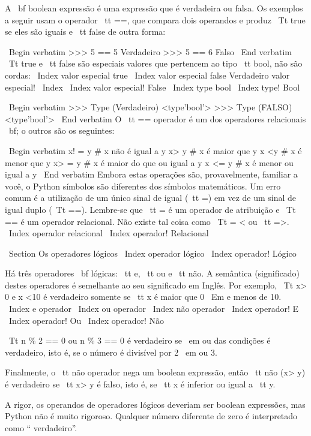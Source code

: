 \documentclass[10pt]{book}
\begin{document}
{{A {\ bf boolean expressão} é uma expressão que é verdadeira
ou falsa. Os exemplos a seguir usam o
operador {\ tt ==}, que compara dois operandos e produz
{\ Tt true} se eles são iguais e {\ tt false} de outra forma:

\ Begin {verbatim}
>>> 5 == 5
Verdadeiro
>>> 5 == 6
Falso
\ End {verbatim}
%
{\ Tt true} e {\ tt false} são especiais
valores que pertencem ao tipo {\ tt bool}, não são cordas:
\ Index {valor especial true}
\ Index {valor especial false}
{Verdadeiro valor especial!} \ Index
\ Index {valor especial! False}
\ Index {type bool}
\ Index {type! Bool}

\ Begin {verbatim}
>>> Type (Verdadeiro)
<type'bool'>
>>> Type (FALSO)
<type'bool'>
\ End {verbatim}
%
O {\ tt ==} operador é um dos operadores relacionais {\ bf}; o
outros são os seguintes:

\ Begin {verbatim}
      x! = y # x não é igual a y
      x> y # x é maior que y
      x <y # x é menor que y
      x> = y # x é maior do que ou igual a y
      x <= y # x é menor ou igual a y
\ End {verbatim}
%
Embora estas operações são, provavelmente, familiar a você, o Python
símbolos são diferentes dos símbolos matemáticos. Um erro comum
é a utilização de um único sinal de igual ({\ tt =}) em vez de um sinal de igual duplo
({\ Tt ==}). Lembre-se que {\ tt =} é um operador de atribuição e
{\ Tt ==} é um operador relacional. Não existe tal coisa como
{\ Tt = <} ou {\ tt =>}.
\ Index {operador relacional}
\ Index {operador! Relacional}


\ Section {} Os operadores lógicos
\ Index {operador lógico}
\ Index {operador! Lógico}

Há três operadores {\ bf lógicas}: {\ tt e}, {\ tt
ou} e {\ tt não}. A semântica (significado) destes operadores é
semelhante ao seu significado em Inglês. Por exemplo,
{\ Tt x> 0 e x <10} é verdadeiro somente se {\ tt x} é maior que 0
{\ Em} e menos de 10.
\ Index {} e operador
\ Index {} ou operador
\ Index {} não operador
\ Index {operador! E}
\ Index {operador! Ou}
\ Index {operador! Não}

{\ Tt n \% 2 == 0 ou n \% 3 == 0} é verdadeiro se {\ em ou} das condições
é verdadeiro, isto é, se o número é divisível por 2 {\ em ou} 3.

Finalmente, o {\ tt não} operador nega um boolean
expressão, então {\ tt não (x> y)} é verdadeiro se {\ tt x> y} é falso,
isto é, se {\ tt x} é inferior ou igual a {\ tt y}.

A rigor, os operandos de operadores lógicos deveriam ser
boolean expressões, mas Python não é muito rigoroso.
Qualquer número diferente de zero é interpretado como `` verdadeiro''.

}}
\end{document}
